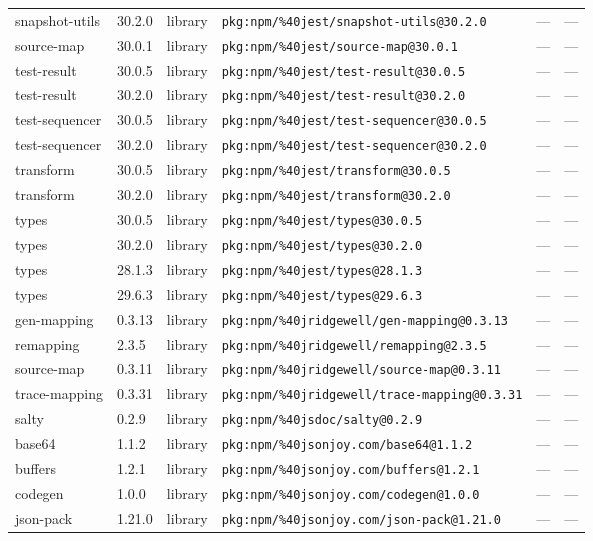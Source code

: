 \documentclass[11pt]{article}
\begin{document}
\begin{longtable}{|l|l|l|p{2.2cm}|l|p{4cm}|}
snapshot-utils & 30.2.0 & library & \texttt{pkg:npm/\%40jest/snapshot-utils@30.2.0} & — & — \\
source-map & 30.0.1 & library & \texttt{pkg:npm/\%40jest/source-map@30.0.1} & — & — \\
test-result & 30.0.5 & library & \texttt{pkg:npm/\%40jest/test-result@30.0.5} & — & — \\
test-result & 30.2.0 & library & \texttt{pkg:npm/\%40jest/test-result@30.2.0} & — & — \\
test-sequencer & 30.0.5 & library & \texttt{pkg:npm/\%40jest/test-sequencer@30.0.5} & — & — \\
test-sequencer & 30.2.0 & library & \texttt{pkg:npm/\%40jest/test-sequencer@30.2.0} & — & — \\
transform & 30.0.5 & library & \texttt{pkg:npm/\%40jest/transform@30.0.5} & — & — \\
transform & 30.2.0 & library & \texttt{pkg:npm/\%40jest/transform@30.2.0} & — & — \\
types & 30.0.5 & library & \texttt{pkg:npm/\%40jest/types@30.0.5} & — & — \\
types & 30.2.0 & library & \texttt{pkg:npm/\%40jest/types@30.2.0} & — & — \\
types & 28.1.3 & library & \texttt{pkg:npm/\%40jest/types@28.1.3} & — & — \\
types & 29.6.3 & library & \texttt{pkg:npm/\%40jest/types@29.6.3} & — & — \\
gen-mapping & 0.3.13 & library & \texttt{pkg:npm/\%40jridgewell/gen-mapping@0.3.13} & — & — \\
remapping & 2.3.5 & library & \texttt{pkg:npm/\%40jridgewell/remapping@2.3.5} & — & — \\
source-map & 0.3.11 & library & \texttt{pkg:npm/\%40jridgewell/source-map@0.3.11} & — & — \\
trace-mapping & 0.3.31 & library & \texttt{pkg:npm/\%40jridgewell/trace-mapping@0.3.31} & — & — \\
salty & 0.2.9 & library & \texttt{pkg:npm/\%40jsdoc/salty@0.2.9} & — & — \\
base64 & 1.1.2 & library & \texttt{pkg:npm/\%40jsonjoy.com/base64@1.1.2} & — & — \\
buffers & 1.2.1 & library & \texttt{pkg:npm/\%40jsonjoy.com/buffers@1.2.1} & — & — \\
codegen & 1.0.0 & library & \texttt{pkg:npm/\%40jsonjoy.com/codegen@1.0.0} & — & — \\
json-pack & 1.21.0 & library & \texttt{pkg:npm/\%40jsonjoy.com/json-pack@1.21.0} & — & — \\

\end{longtable}
\end{document}
